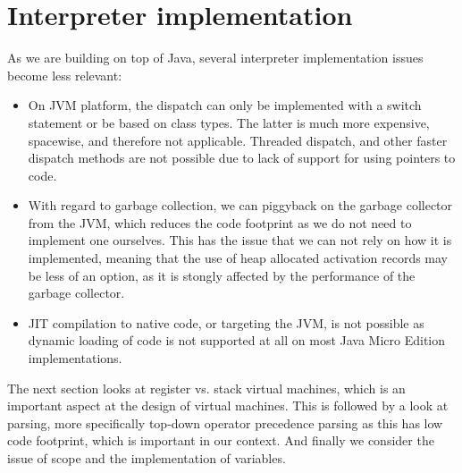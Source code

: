 \documentclass[11pt]{report}
\begin{document}
\section{Interpreter implementation}
\label{interpreter-implementation}

As we are building on top of Java, 
several interpreter implementation issues
become less relevant:
\begin{itemize}
\item On JVM platform, the dispatch can only be implemented 
with a switch statement or be based on class types. The
latter is much more expensive, spacewise, and therefore not applicable.
Threaded dispatch, and other faster dispatch methods are not possible
due to lack of support for using pointers to code.
\item With regard to garbage collection, we can piggyback on the garbage collector from the JVM, which reduces the code footprint as we do not need to implement one ourselves. This has the issue that we can not rely on how it is implemented, meaning that the use of heap allocated activation records may be less of an option, as it is stongly affected by the performance of the garbage collector.
\item JIT compilation to native code, or targeting the JVM, is not possible as dynamic loading of code is not supported at all on most Java Micro Edition implementations.
\end{itemize}

The next section looks at register vs. stack virtual machines, which is an important aspect at the design of virtual machines. This is followed by a look at parsing, more specifically top-down operator precedence parsing as this has low code footprint, which is important in our context. And finally we consider the issue of  scope and the implementation of variables.


\end{document}
